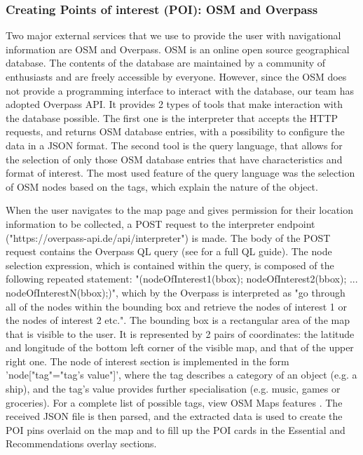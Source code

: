 \subsubsection{Creating Points of interest (POI): OSM and Overpass}

Two major external services that we use to provide the user with navigational information are OSM and Overpass. OSM is an online open source geographical database. The contents of the database are maintained by a community of enthusiasts and are freely accessible by everyone. However, since the OSM does not provide a programming interface to interact with the database, our team has adopted Overpass API. It provides 2 types of tools that make interaction with the database possible. The first one is the interpreter that accepts the HTTP requests, and returns OSM database entries, with a possibility to configure the data in a JSON format. The second tool is the query language, that allows for the selection of only those OSM database entries that have characteristics and format of interest. The most used feature of the query language was the selection of OSM nodes based on the tags, which explain the nature of the object. 

When the user navigates to the map page and gives permission for their location information to be collected, a POST request to the interpreter endpoint ("https://overpass-api.de/api/interpreter") \cite{OverpassAPIDocsWiki} is made. The body of the POST request contains the Overpass QL query (see \cite{OverpassAPIQueryLanguageGuide} for a full QL guide). The node selection expression, which is contained within the query, is composed of the following repeated statement: "(nodeOfInterest1(bbox); nodeOfInterest2(bbox); ... nodeOfInterestN(bbox);)", which by the Overpass is interpreted as "go through all of the nodes within the bounding box and retrieve the nodes of interest 1 or the nodes of interest 2 etc.". The bounding box is a rectangular area of the map that is visible to the user. It is represented by 2 pairs of coordinates: the latitude and longitude of the bottom left corner of the visible map, and that of the upper right one. The node of interest section is implemented in the form 'node["tag"="tag's value"]', where the tag describes a category of an object (e.g. a ship), and the tag's value provides further specialisation (e.g. music, games or groceries). For a complete list of possible tags, view OSM Maps features \cite{OSM_map_features}. The received JSON file is then parsed, and the extracted data is used to create the POI pins overlaid on the map and to fill up the POI cards in the Essential and Recommendations overlay sections.

